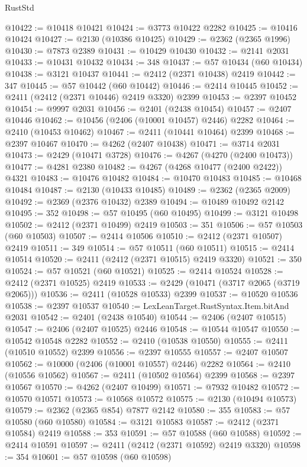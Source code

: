 \begin{lexlean}{RustStd}
\begin{coremodule}
@10422 := @10418 @10421
@10424 := @3773 @10422 @2282
@10425 := @10416 @10424
@10427 := @2130 (@10386 @10425)
@10429 := @2362 (@2365 @1996)
@10430 := @7873 @2389
@10431 := @10429 @10430
@10432 := @2141 @2031
@10433 := @10431 @10432
@10434 := 348
@10437 := @57 @10434 (@60 @10434)
@10438 := @3121 @10437
@10441 := @2412 (@2371 @10438) @2419
@10442 := 347
@10445 := @57 @10442 (@60 @10442)
@10446 := @2414 @10445
@10452 := @2411 (@2412 (@2371 @10446) @2419 @3320) @2399
@10453 := @2397 @10452
@10454 := @9997 @2031
@10456 := @2401 (@2438 @10454)
@10457 := @2407 @10446
@10462 := @10456 (@2406 (@10001 @10457) @2446) @2282
@10464 := @2410 (@10453 @10462)
@10467 := @2411 (@10441 @10464) @2399
@10468 := @2397 @10467
@10470 := @4262 (@2407 @10438)
@10471 := @3714 @2031
@10473 := @2429 (@10471 @3728)
@10476 := @4267 (@4270 (@2400 @10473))
@10477 := @4281 @2380
@10482 := @4267 (@4268 @10477 (@2400 @2422)) @4321
@10483 := @10476 @10482
@10484 := @10470 @10483
@10485 := @10468 @10484
@10487 := @2130 (@10433 @10485)
@10489 := @2362 (@2365 @2009)
@10492 := @2369 (@2376 @10432) @2389
@10494 := @10489 @10492 @2142
@10495 := 352
@10498 := @57 @10495 (@60 @10495)
@10499 := @3121 @10498
@10502 := @2412 (@2371 @10499) @2419
@10503 := 351
@10506 := @57 @10503 (@60 @10503)
@10507 := @2414 @10506
@10510 := @2412 (@2371 @10507) @2419
@10511 := 349
@10514 := @57 @10511 (@60 @10511)
@10515 := @2414 @10514
@10520 := @2411 (@2412 (@2371 @10515) @2419 @3320)
@10521 := 350
@10524 := @57 @10521 (@60 @10521)
@10525 := @2414 @10524
@10528 := @2412 (@2371 @10525) @2419
@10533 := @2429 (@10471 (@3717 @2065 (@3719 @2065)))
@10536 := @2411 (@10528 @10533) @2399
@10537 := @10520 @10536
@10538 := @2397 @10537
@10540 := LexLeanTarget.RustSyntax.Item.bitAnd @2031
@10542 := @2401 (@2438 @10540)
@10544 := @2406 (@2407 @10515)
@10547 := @2406 (@2407 @10525) @2446
@10548 := @10544 @10547
@10550 := @10542 @10548 @2282
@10552 := @2410 (@10538 @10550)
@10555 := @2411 (@10510 @10552) @2399
@10556 := @2397 @10555
@10557 := @2407 @10507
@10562 := @10000 (@2406 (@10001 @10557) @2446) @2282
@10564 := @2410 (@10556 @10562)
@10567 := @2411 (@10502 @10564) @2399
@10568 := @2397 @10567
@10570 := @4262 (@2407 @10499)
@10571 := @7932 @10482
@10572 := @10570 @10571
@10573 := @10568 @10572
@10575 := @2130 (@10494 @10573)
@10579 := @2362 (@2365 @854) @7877 @2142
@10580 := 355
@10583 := @57 @10580 (@60 @10580)
@10584 := @3121 @10583
@10587 := @2412 (@2371 @10584) @2419
@10588 := 353
@10591 := @57 @10588 (@60 @10588)
@10592 := @2414 @10591
@10597 := @2411 (@2412 (@2371 @10592) @2419 @3320)
@10598 := 354
@10601 := @57 @10598 (@60 @10598)

\end{coremodule}
\end{lexlean}
